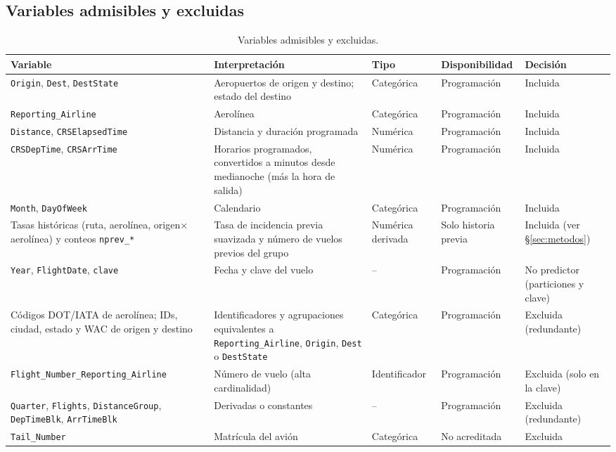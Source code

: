 \documentclass[11pt,a4paper]{article}
\newcommand{\code}[1]{\texttt{#1}}
\begin{document}
\subsection{Variables admisibles y excluidas}
\begin{table}[!htbp]
\centering
\caption{Variables admisibles y excluidas.}
\label{tab:variables}
\footnotesize
\begin{tabularx}{\textwidth}{@{}L{4.6cm}XL{1.8cm}L{1.9cm}L{2.3cm}@{}}
\toprule
Variable & Interpretación & Tipo & Disponibilidad & Decisión \\
\midrule
\code{Origin}, \code{Dest}, \code{DestState} & Aeropuertos de origen y destino; estado del destino & Categórica & Programación & Incluida \\
\code{Reporting\_Airline} & Aerolínea & Categórica & Programación & Incluida \\
\code{Distance}, \code{CRSElapsedTime} & Distancia y duración programada & Numérica & Programación & Incluida \\
\code{CRSDepTime}, \code{CRSArrTime} & Horarios programados, convertidos a minutos desde medianoche (más la hora de salida) & Numérica & Programación & Incluida \\
\code{Month}, \code{DayOfWeek} & Calendario & Categórica & Programación & Incluida \\
Tasas históricas (ruta, aerolínea, origen$\times$aerolínea) y conteos \code{nprev\_*} & Tasa de incidencia previa suavizada y número de vuelos previos del grupo & Numérica derivada & Solo historia previa & Incluida (ver \S\ref{sec:metodos}) \\
\midrule
\code{Year}, \code{FlightDate}, \code{clave} & Fecha y clave del vuelo & -- & Programación & No predictor (particiones y clave) \\
Códigos DOT/IATA de aerolínea; IDs, ciudad, estado y WAC de origen y destino & Identificadores y agrupaciones equivalentes a \code{Reporting\_Airline}, \code{Origin}, \code{Dest} o \code{DestState} & Categórica & Programación & Excluida (redundante) \\
\code{Flight\_Number\_\allowbreak Reporting\_Airline} & Número de vuelo (alta cardinalidad) & Identificador & Programación & Excluida (solo en la clave) \\
\code{Quarter}, \code{Flights}, \code{DistanceGroup}, \code{DepTimeBlk}, \code{ArrTimeBlk} & Derivadas o constantes & -- & Programación & Excluida (redundante) \\
\code{Tail\_Number} & Matrícula del avión & Categórica & No acreditada & Excluida \\

\end{tabularx}
\end{table}
\end{document}
